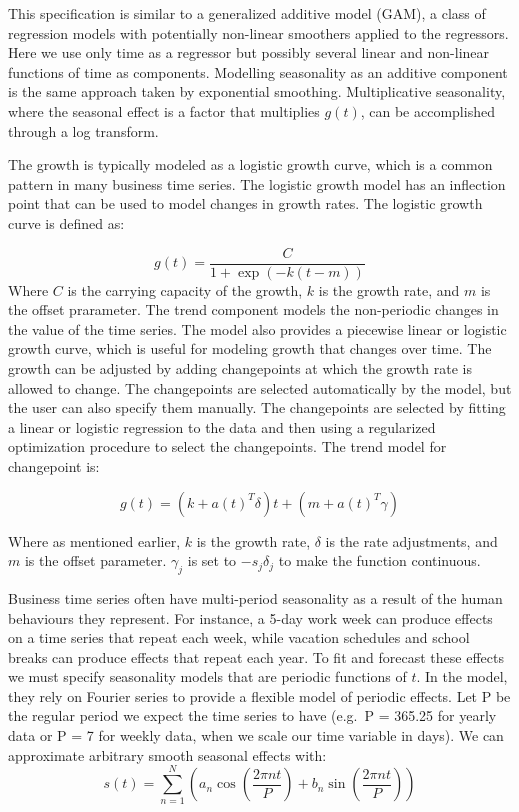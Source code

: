 \documentclass[mstat,12pt]{unswthesis}
\begin{document}
This specification is similar to a generalized additive model (GAM), a
class of regression models with potentially non-linear smoothers applied
to the regressors. Here we use only time as a regressor but possibly
several linear and non-linear functions of time as components. Modelling
seasonality as an additive component is the same approach taken by
exponential smoothing. Multiplicative seasonality, where the seasonal
effect is a factor that multiplies \(g(t)\), can be accomplished through
a log transform.

The growth is typically modeled as a logistic growth curve, which is a
common pattern in many business time series. The logistic growth model
has an inflection point that can be used to model changes in growth
rates. The logistic growth curve is defined as:

\[
g(t) = \frac{C}{1 + \exp(-k(t - m))}
\] Where \(C\) is the carrying capacity of the growth, \(k\) is the
growth rate, and \(m\) is the offset prarameter. The trend component
models the non-periodic changes in the value of the time series. The
model also provides a piecewise linear or logistic growth curve, which
is useful for modeling growth that changes over time. The growth can be
adjusted by adding changepoints at which the growth rate is allowed to
change. The changepoints are selected automatically by the model, but
the user can also specify them manually. The changepoints are selected
by fitting a linear or logistic regression to the data and then using a
regularized optimization procedure to select the changepoints. The trend
model for changepoint is:

\[
g(t) = (k+a(t)^T\delta) t + (m+a(t)^T\gamma)
\]

Where as mentioned earlier, \(k\) is the growth rate, \(\delta\) is the
rate adjustments, and \(m\) is the offset parameter. \(\gamma_j\) is set
to \(-s_j\delta_j\) to make the function continuous.

Business time series often have multi-period seasonality as a result of
the human behaviours they represent. For instance, a 5-day work week can
produce effects on a time series that repeat each week, while vacation
schedules and school breaks can produce effects that repeat each year.
To fit and forecast these effects we must specify seasonality models
that are periodic functions of \(t\). In the model, they rely on Fourier
series to provide a flexible model of periodic effects. Let P be the
regular period we expect the time series to have (e.g.~P = 365.25 for
yearly data or P = 7 for weekly data, when we scale our time variable in
days). We can approximate arbitrary smooth seasonal effects with: \[
s(t) = \sum_{n=1}^{N} (a_n \cos(\frac{2\pi nt}{P}) + b_n \sin(\frac{2\pi nt}{P}))
\]
\end{document}
